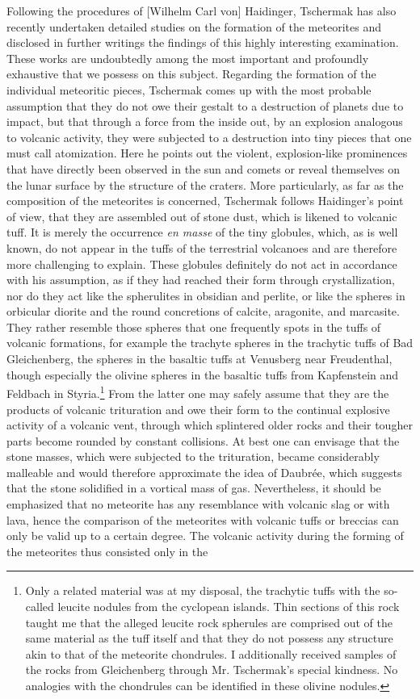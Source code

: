 \documentclass[a4paper, 12pt, oneside]{article}
\begin{document}
Following the procedures of [Wilhelm Carl von] Haidinger, Tschermak has also recently undertaken detailed studies on the formation of the meteorites and disclosed in further writings the findings of this highly interesting examination. These works are undoubtedly among the most important and profoundly exhaustive that we possess on this subject. Regarding the formation of the individual meteoritic pieces, Tschermak comes up with the most probable assumption that they do not owe their gestalt to a destruction of planets due to impact, but that through a force from the inside out, by an explosion analogous to volcanic activity, they were subjected to a destruction into tiny pieces that one must call atomization. Here he points out the violent, explosion-like prominences that have directly been observed in the sun and comets or reveal themselves on the lunar surface by the structure of the craters. More particularly, as far as the composition of the meteorites is concerned, Tschermak follows Haidinger's point of view, that they are assembled out of stone dust, which is likened to volcanic tuff. It is merely the occurrence \emph{en masse} of the tiny globules, which, as is well known, do not appear in the tuffs of the terrestrial volcanoes and are therefore more challenging to explain. These globules definitely do not act in accordance with his assumption, as if they had reached their form through crystallization, nor do they act like the spherulites in obsidian and perlite, or like the spheres in orbicular diorite and the round concretions of calcite, aragonite, and marcasite. They rather resemble those spheres that one frequently spots in the tuffs of volcanic formations, for example the trachyte spheres in the trachytic tuffs of Bad Gleichenberg, the spheres in the basaltic tuffs at Venusberg near Freudenthal, though especially the olivine spheres in the basaltic tuffs from Kapfenstein and Feldbach in Styria.\footnote{Only a related material was at my disposal, the trachytic tuffs with the so-called leucite nodules from the cyclopean islands. Thin sections of this rock taught me that the alleged leucite rock spherules are comprised out of the same material as the tuff itself and that they do not possess any structure akin to that of the meteorite chondrules. I additionally received samples of the rocks from Gleichenberg through Mr. Tschermak's special kindness. No analogies with the chondrules can be identified in these olivine nodules.} From the latter one may safely assume that they are the products of volcanic trituration and owe their form to the continual explosive activity of a volcanic vent, through which splintered older rocks and their tougher parts become rounded by constant collisions. At best one can envisage that the stone masses, which were subjected to the trituration, became considerably malleable and would therefore approximate the idea of Daubrée, which suggests that the stone solidified in a vortical mass of gas. Nevertheless, it should be emphasized that no meteorite has any resemblance with volcanic slag or with lava, hence the comparison of the meteorites with volcanic tuffs or breccias can only be valid up to a certain degree. The volcanic activity during the forming of the meteorites thus consisted only in the 
\end{document}
